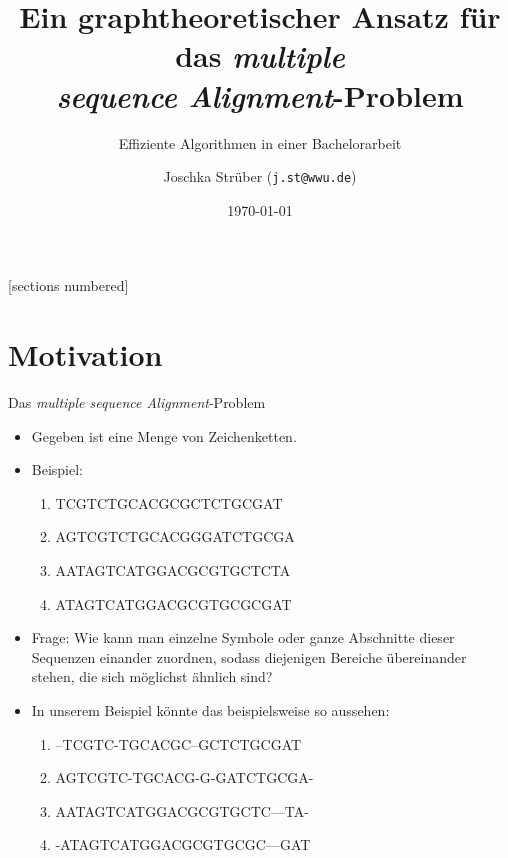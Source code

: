 \documentclass[wide,xcolor={x11names},hyperref={colorlinks=false},pantone312]{beamer}
\author{Joschka Strüber (\texttt{j.st@wwu.de})}
\title{Ein graphtheoretischer Ansatz für das \textit{multiple \\ sequence Alignment}-Problem}
\subtitle{\glqq Effiziente Algorithmen\grqq{} in einer Bachelorarbeit}
\date{\today}
\begin{document}
[sections numbered]

\begin{frame}[plain]
  \maketitle
\end{frame}

\begin{frame}[t]{}
\end{frame}

\AtBeginSection[]
{
	\begin{frame}[t]
		\tableofcontents[currentsection, hidesubsections, hideothersubsections,sectionstyle=show/shaded]
	\end{frame}
}

\section{Motivation}

\begin{frame}[t]{Das \textit{multiple sequence Alignment}-Problem}
	\begin{itemize}
		\item Gegeben ist eine Menge von Zeichenketten.
		\item Beispiel:
		\begin{enumerate}
			\ttfamily
			\item TCGTCTGCACGCGCTCTGCGAT
			\item AGTCGTCTGCACGGGATCTGCGA
			\item AATAGTCATGGACGCGTGCTCTA
			\item ATAGTCATGGACGCGTGCGCGAT
			\normalfont
		\end{enumerate}
		\item Frage: Wie kann man einzelne Symbole oder ganze Abschnitte dieser Sequenzen einander zuordnen, sodass diejenigen Bereiche übereinander stehen, die sich möglichst ähnlich sind? \pause
		\item In unserem Beispiel könnte das beispielsweise so aussehen:
		\begin{enumerate}
			\ttfamily
			\item --TCGTC-TGCACGC--GCTCTGCGAT
			\item AGTCGTC-TGCACG-G-GATCTGCGA-
			\item AATAGTCATGGACGCGTGCTC---TA-
			\item -ATAGTCATGGACGCGTGCGC---GAT
			\normalfont
		\end{enumerate}		
	\end{itemize}
\end{frame}
\end{document}
